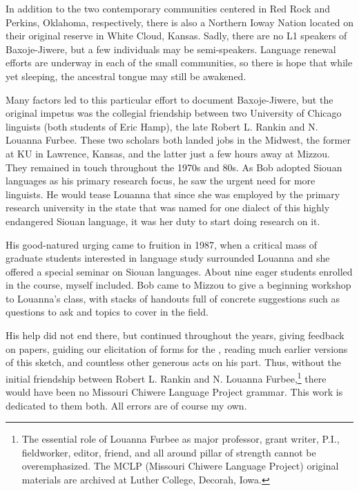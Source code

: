 \documentclass[output=paper]{LSP/langsci}
\begin{document}
In addition to the two contemporary communities centered in Red Rock and Perkins, Oklahoma, respectively, there is also a Northern Ioway Nation located on their original reserve in White Cloud, Kansas.  Sadly, there are no L1 speakers of Baxoje-Jiwere, but a few individuals may be semi-speakers.  Language renewal efforts are underway in each of the small communities, so there is hope that while yet sleeping, the ancestral tongue may still be awakened.    

Many factors led to this particular effort to document Baxoje-Jiwere, but the original impetus was the collegial friendship between two University of Chicago linguists (both students of Eric Hamp), the late Robert L. Rankin and N. Louanna Furbee. These two scholars both landed jobs in the Midwest, the former at KU in Lawrence, Kansas, and the latter just a few hours away at Mizzou.  They remained in touch throughout the 1970s and 80s.  As Bob adopted Siouan languages as his primary research focus, he saw the urgent need for more linguists. He would tease Louanna that since she was employed by the primary research university in the state that was named for one dialect of this highly endangered Siouan language, it was her duty to start doing research on it.  

His good-natured urging came to fruition in 1987, when a critical mass of graduate students interested in language study surrounded Louanna and she offered a special seminar on Siouan languages.  About nine eager students enrolled in the course, myself included.  Bob came to Mizzou to give a beginning workshop to Louanna's class, with stacks of handouts full of concrete suggestions such as questions to ask and topics to cover in the field.  

His help did not end there, but continued throughout the years, giving feedback on papers, guiding our elicitation of forms for the , reading much earlier versions of this sketch, and countless other generous acts on his part. Thus, without the initial friendship between Robert L. Rankin and N. Louanna Furbee,\footnote{The essential role of Louanna Furbee as major professor, grant writer, P.I., fieldworker, editor, friend, and all around pillar of strength cannot be overemphasized. The MCLP (Missouri Chiwere Language Project) original materials are archived at Luther College, Decorah, Iowa.} there would have been no Missouri Chiwere Language Project grammar.  This work is dedicated to them both.  All errors are of course my own.  
\end{document}
